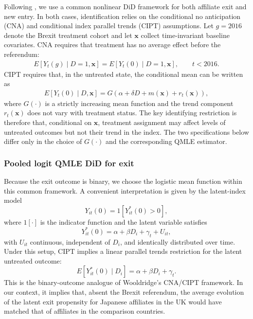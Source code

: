 \documentclass[preprint,11pt,authoryear]{elsarticle}
\begin{document}
Following \citet{wooldridge2023simple}, we use a common nonlinear DiD framework for both affiliate exit and new entry. In both cases, identification relies on the conditional no anticipation (CNA) and conditional index parallel trends (CIPT) assumptions. Let $g=2016$ denote the Brexit treatment cohort and let $\mathbf{x}$ collect time-invariant baseline covariates. CNA requires that treatment has no average effect before the referendum:
\begin{align}
E\!\left[Y_t(g)\mid D=1,\mathbf{x}\right] = E\!\left[Y_t(0)\mid D=1,\mathbf{x}\right], \qquad t<2016.
\end{align}
CIPT requires that, in the untreated state, the conditional mean can be written as
\begin{align}
E\!\left[Y_t(0)\mid D,\mathbf{x}\right] = G\!\left(\alpha + \delta D + m(\mathbf{x}) + r_t(\mathbf{x})\right),
\end{align}
where $G(\cdot)$ is a strictly increasing mean function and the trend component $r_t(\mathbf{x})$ does not vary with treatment status. The key identifying restriction is therefore that, conditional on $\mathbf{x}$, treatment assignment may affect levels of untreated outcomes but not their trend in the index. The two specifications below differ only in the choice of $G(\cdot)$ and the corresponding QMLE estimator.

\subsubsection{Pooled logit QMLE DiD for exit}

Because the exit outcome is binary, we choose the logistic mean function within this common framework. A convenient interpretation is given by the latent-index model
\begin{equation}
Y_{it}(0)=1\left[Y_{it}^{*}(0)>0\right],
\end{equation}
where $1[\cdot]$ is the indicator function and the latent variable satisfies
\begin{equation}
Y_{it}^{*}(0)=\alpha+\beta D_i+\gamma_t+U_{it},
\end{equation}
with $U_{it}$ continuous, independent of $D_i$, and identically distributed over time. Under this setup, CIPT implies a linear parallel trends restriction for the latent untreated outcome:
\begin{equation}
E\left[Y_{it}^{*}(0)\mid D_i\right]=\alpha+\beta D_i+\gamma_t.
\end{equation}
This is the binary-outcome analogue of Wooldridge's CNA/CIPT framework. In our context, it implies that, absent the Brexit referendum, the average evolution of the latent exit propensity for Japanese affiliates in the UK would have matched that of affiliates in the comparison countries.
\end{document}
